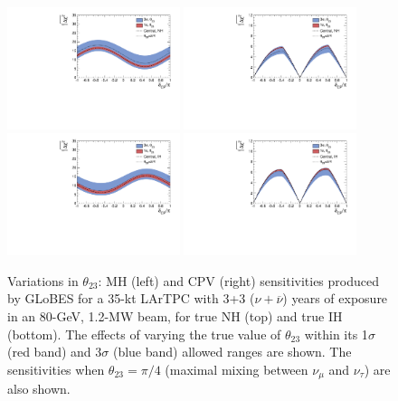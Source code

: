 \documentclass[letterpaper,11pt]{article}
\begin{document}
\begin{figure}[!htb]
  \centering
  \includegraphics[width=0.45\textwidth]{figs/mh_35kt_nh_th23.pdf}
  \includegraphics[width=0.45\textwidth]{figs/cpv_35kt_nh_th23.pdf}
  \includegraphics[width=0.45\textwidth]{figs/mh_35kt_ih_th23.pdf}
  \includegraphics[width=0.45\textwidth]{figs/cpv_35kt_ih_th23.pdf}
  \caption{
  Variations in $\theta_{23}$: 
  MH (left) and CPV (right) sensitivities 
  produced by GLoBES for a 35-kt LArTPC with 3+3 ($\nu + \overline{\nu}$) years of 
  exposure in an 80-GeV, 1.2-MW beam,  for true NH (top) and true IH (bottom). 
  The effects of varying the true
  value of $\theta_{23}$ within its 1$\sigma$ (red band) and 3$\sigma$ (blue band)
  allowed ranges are shown. The sensitivities when $\theta_{23} = \pi/4$ (maximal
  mixing between $\nu_{\mu}$ and $\nu_{\tau}$) are also shown.} 
  \label{fig:th23sens}
\end{figure}
\end{document}
